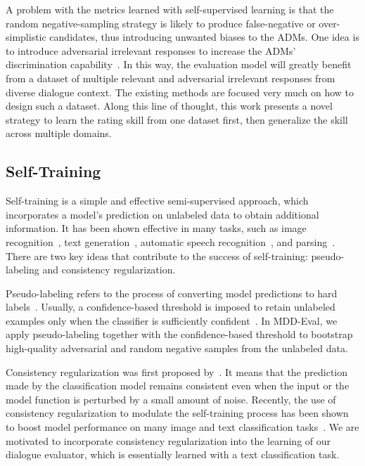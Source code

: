 \documentclass[letterpaper]{article} \usepackage{aaai22}  \usepackage{times}  \usepackage{helvet}  \usepackage{courier}  \usepackage[hyphens]{url}  \usepackage{graphicx} \urlstyle{rm} \def\UrlFont{\rm}  \usepackage{natbib}  \usepackage{caption} \DeclareCaptionStyle{ruled}{labelfont=normalfont,labelsep=colon,strut=off} \frenchspacing  \setlength{\pdfpagewidth}{8.5in}  \setlength{\pdfpageheight}{11in}  \usepackage{algorithm}
\begin{document}
A problem with the metrics learned with self-supervised learning is that the random negative-sampling strategy is likely to produce false-negative or over-simplistic candidates, thus introducing unwanted biases to the ADMs. One idea is to introduce adversarial irrelevant responses to increase the ADMs' discrimination capability~\citep{sai-etal-2020-improving,gupta-etal-2021-synthesizing,park-etal-2021-generating}. In this way, the evaluation model will greatly benefit from a dataset of multiple relevant and adversarial irrelevant responses from diverse dialogue context. The existing methods are focused very much on how to design such a dataset. Along this line of thought, this work presents a novel strategy to learn the rating skill from one dataset first, then generalize the skill across multiple domains. 

\subsection{Self-Training}
Self-training is a simple and effective semi-supervised approach, which incorporates a model’s prediction on unlabeled data to obtain additional information. It has been shown effective in many tasks, such as image recognition~\citep{yalniz2019billion}, text generation~\citep{he2019revisiting}, automatic speech recognition~\citep{kahn2020self}, and parsing~\citep{mcclosky-etal-2006-effective}. There are two key ideas that contribute to the success of self-training: pseudo-labeling and consistency regularization. 

Pseudo-labeling refers to the process of converting model predictions to hard labels~\citep{lee2013pseudo}. Usually, a confidence-based threshold is imposed to retain unlabeled examples only when the classifier is sufficiently confident~\citep{sohn2020fixmatch}. In MDD-Eval, we apply pseudo-labeling together with the confidence-based threshold to
bootstrap high-quality adversarial and random negative samples from the unlabeled data.

Consistency regularization was first proposed by~\citep{bachman2014learning}. It means that the prediction made by the classification model remains consistent even when the input or the model function is perturbed by a small amount of noise. Recently, the use of consistency regularization to modulate the self-training process has been shown to boost model performance on many image and text classification tasks~\citep{xie2020unsupervised,Berthelot2020ReMixMatch}. We are motivated to incorporate consistency regularization into the learning of our dialogue evaluator, which is essentially learned with a text classification task.
\end{document}
